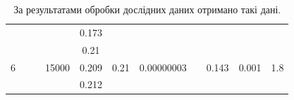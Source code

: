 \documentclass[a4paper,12pt]{article}
\begin{document}
\begin{table}[h!]
\begin{tabular}{|c|c|c|c|c|c|c|c|c|c|c|}
			&                        &                                                          &                        & 0.173  &                        &                             &                                 &                        &                        &                        \\ \cline{1-1} \cline{4-7} \cline{9-11} 
			\multirow{3}{*}{6} &                        &                                                          & \multirow{3}{*}{15000} & 0.21   & \multirow{3}{*}{0.21}  & \multirow{3}{*}{0.00000003} &                                 & \multirow{3}{*}{0.143} & \multirow{3}{*}{0.001} & \multirow{3}{*}{1.8}   \\ \cline{5-5}
			&                        &                                                          &                        & 0.209  &                        &                             &                                 &                        &                        &                        \\ \cline{5-5}
			&                        &                                                          &                        & 0.212  &                        &                             &                                 &                        &                        &                        \\ \hline
		\end{tabular}
	\caption{За результатами обробки дослідних даних отримано такі дані.}
	\label{tabular:1}
	\end{table}
\end{document}
